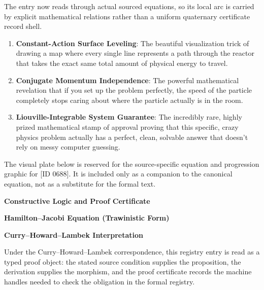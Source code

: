 The entry now reads through actual sourced equations, so its local arc is carried by explicit mathematical relations rather than a uniform quaternary certificate record shell.
\endgroup

\begin{enumerate}[leftmargin=1.6em,itemsep=6pt,topsep=4pt]
\item \textbf{Constant-Action Surface Leveling}: The beautiful visualization trick of drawing a map where every single line represents a path through the reactor that takes the exact same total amount of physical energy to travel.
\item \textbf{Conjugate Momentum Independence}: The powerful mathematical revelation that if you set up the problem perfectly, the speed of the particle completely stops caring about where the particle actually is in the room.
\item \textbf{Liouville-Integrable System Guarantee}: The incredibly rare, highly prized mathematical stamp of approval proving that this specific, crazy physics problem actually has a perfect, clean, solvable answer that doesn't rely on messy computer guessing.
\end{enumerate}

\begingroup\footnotesize\sloppy
The visual plate below is reserved for the source-specific equation and progression graphic for [ID 0688]. It is included only as a companion to the canonical equation, not as a substitute for the formal text.
\par\endgroup
\ifTZPDarkEdition
{}
\fi

\clearpage
\begingroup\tzpsupportsetup
\noindent\textbf{\fontsize{10.8pt}{12.8pt}\selectfont [ID 0688] Constructive Logic and Proof Certificate}\par
\noindent\textbf{\fontsize{10pt}{12pt}\selectfont Hamilton--Jacobi Equation (Trawinistic Form)}\par
\vspace{0.45em}
\begingroup
\footnotesize
\setlength{\parskip}{0.22em}
\setlength{\parindent}{0pt}
\noindent\textbf{Curry--Howard--Lambek Interpretation}\par
Under the Curry--Howard--Lambek correspondence, this registry entry is read as a typed proof
object: the stated source condition supplies the proposition, the derivation supplies the
morphism, and the proof certificate records the machine handles needed to check the obligation
in the formal registry.

